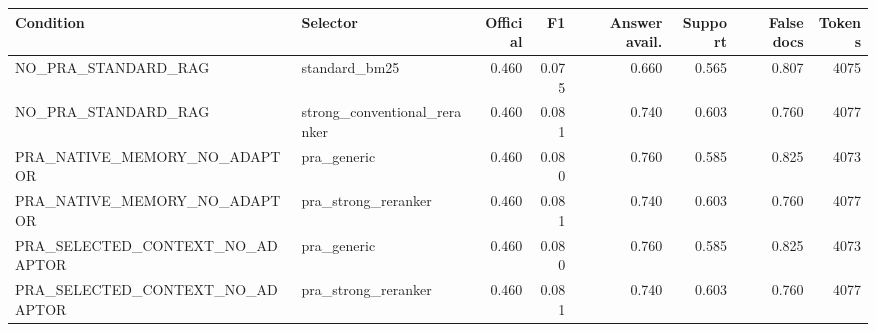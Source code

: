 \begin{tabular}{llrrrrrr}
\toprule
Condition & Selector & Official & F1 & Answer avail. & Support & False docs & Tokens \\
\midrule
NO\_PRA\_STANDARD\_RAG & standard\_bm25 & 0.460 & 0.075 & 0.660 & 0.565 & 0.807 & 4075 \\
NO\_PRA\_STANDARD\_RAG & strong\_conventional\_reranker & 0.460 & 0.081 & 0.740 & 0.603 & 0.760 & 4077 \\
PRA\_NATIVE\_MEMORY\_NO\_ADAPTOR & pra\_generic & 0.460 & 0.080 & 0.760 & 0.585 & 0.825 & 4073 \\
PRA\_NATIVE\_MEMORY\_NO\_ADAPTOR & pra\_strong\_reranker & 0.460 & 0.081 & 0.740 & 0.603 & 0.760 & 4077 \\
PRA\_SELECTED\_CONTEXT\_NO\_ADAPTOR & pra\_generic & 0.460 & 0.080 & 0.760 & 0.585 & 0.825 & 4073 \\
PRA\_SELECTED\_CONTEXT\_NO\_ADAPTOR & pra\_strong\_reranker & 0.460 & 0.081 & 0.740 & 0.603 & 0.760 & 4077 \\
\bottomrule
\end{tabular}
